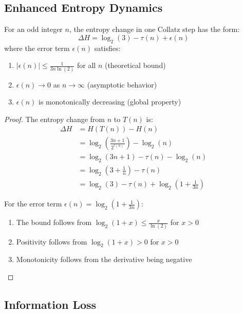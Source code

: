 \subsection{Enhanced Entropy Dynamics}

\begin{theorem}
For an odd integer $n$, the entropy change in one Collatz step has the form:
\[
\Delta H = \log_2(3) - \tau(n) + \epsilon(n)
\]
where the error term $\epsilon(n)$ satisfies:
\begin{enumerate}
\item $|\epsilon(n)| \leq \frac{1}{3n\ln(2)}$ for all $n$ (theoretical bound)
\item $\epsilon(n) \to 0$ as $n \to \infty$ (asymptotic behavior)
\item $\epsilon(n)$ is monotonically decreasing (global property)
\end{enumerate}
\end{theorem}

\begin{proof}
The entropy change from $n$ to $T(n)$ is:
\begin{align*}
\Delta H &= H(T(n)) - H(n) \\
&= \log_2\left(\frac{3n + 1}{2^{\tau(n)}}\right) - \log_2(n) \\
&= \log_2(3n + 1) - \tau(n) - \log_2(n) \\
&= \log_2(3 + \frac{1}{n}) - \tau(n) \\
&= \log_2(3) - \tau(n) + \log_2(1 + \frac{1}{3n})
\end{align*}

For the error term $\epsilon(n) = \log_2(1 + \frac{1}{3n})$:
\begin{enumerate}
\item The bound follows from $\log_2(1+x) \leq \frac{x}{\ln(2)}$ for $x > 0$
\item Positivity follows from $\log_2(1+x) > 0$ for $x > 0$
\item Monotonicity follows from the derivative being negative
\end{enumerate}
\end{proof}

\subsection{Information Loss}

